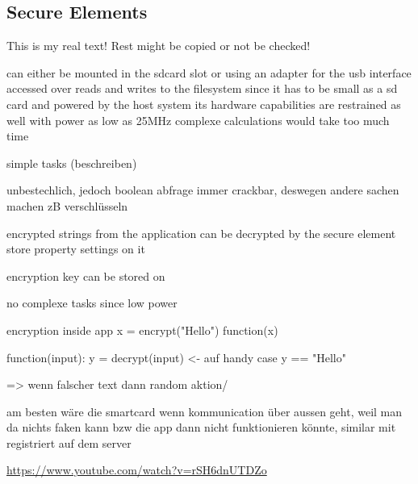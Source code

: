 \subsection{Secure Elements}\label{subsection:counter-external-secure}
This is my real text! Rest might be copied or not be checked!

can either be mounted in the sdcard slot or using an adapter for the usb interface
accessed over reads and writes to the filesystem
since it has to be small as a sd card and powered by the host system its hardware capabilities are restrained as well \cite{stSe} with power as low as 25MHz complexe calculations would take too much time

simple tasks (beschreiben)

unbestechlich, jedoch boolean abfrage immer crackbar, deswegen andere sachen machen zB verschlüsseln

encrypted strings from the application can be decrypted by the secure element
store property settings on it

encryption key can be stored on

no complexe tasks since low power


encryption inside app
x = encrypt("Hello")
function(x)

function(input):
y = decrypt(input) <- auf handy
case y == "Hello"

=> wenn falscher text dann random aktion/


am besten wäre die smartcard wenn kommunication über aussen geht, weil man da nichts faken kann bzw die app dann nicht funktionieren könnte, similar mit registriert auf dem server

\url{https://www.youtube.com/watch?v=rSH6dnUTDZo}

